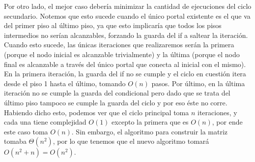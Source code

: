 \documentclass{article}
\theoremstyle{definition}
\theoremstyle{remark}
\begin{document}
Por otro lado, el mejor caso debería minimizar la cantidad de ejecuciones del ciclo secundario. Notemos que esto sucede cuando el único portal existente es el que va del primer piso al último piso, ya que esto implicaría que todos los pisos intermedios no serían alcanzables, forzando la guarda del if a saltear la iteración. Cuando esto sucede, las únicas iteraciones que realizaremos serán la primera (porque el nodo inicial es alcanzable trivialmente) y la última (porque el nodo final es alcanzable a través del único portal que conecta al inicial con el mismo). En la primera iteración, la guarda del if no se cumple y el ciclo en cuestión itera desde el piso 1 hasta el último, tomando $O(n)$ pasos. Por último, en la última iteración no se cumple la guarda del condicional pero dado que se trata del último piso tampoco se cumple la guarda del ciclo y por eso éste no corre. Habiendo dicho esto, podemos ver que el ciclo principal toma $n$ iteraciones, y cada una tiene complejidad $O(1)$ excepto la primera que es $O(n)$, por ende este caso toma $O(n)$. Sin embargo, el algoritmo para construir la matriz tomaba $\Theta(n^2)$, por lo que tenemos que el nuevo algoritmo tomará $O(n^2 + n) = O(n^2)$.
\end{document}
